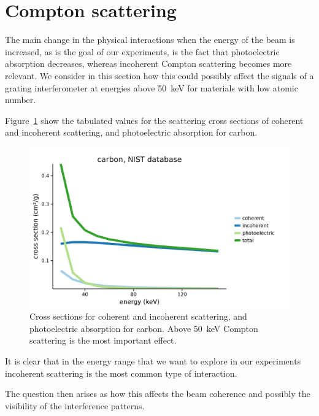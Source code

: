 \section{Compton scattering}
The main change in the physical interactions when the energy of the beam is
increased, as is the goal of our experiments, is the fact that photoelectric
absorption decreases, whereas incoherent Compton scattering becomes more
relevant. We consider in this section how this could possibly affect the
signals of a grating interferometer at energies above \SI{50}{\kilo\eV} for
materials with low atomic number.

Figure~\ref{fig:carbon-cross-sections} show the tabulated values for the
scattering cross sections of coherent and incoherent scattering, and
photoelectric absorption for carbon.

\begin{figure}[htb]
    \centering
    \includegraphics[width=\textwidth]{gfx/compton/carbon_cross_section.png}
    \caption{Cross sections for coherent and incoherent scattering, and
        photoelectric absorption for carbon. Above \SI{50}{\kilo\eV} Compton
    scattering is the most important effect.}
    \label{fig:carbon-cross-sections}
\end{figure}

It is clear that in the energy range that we want to explore in our
experiments incoherent scattering is the most common type of interaction.

The question then arises as how this affects the beam coherence and possibly
the visibility of the interference patterns.
